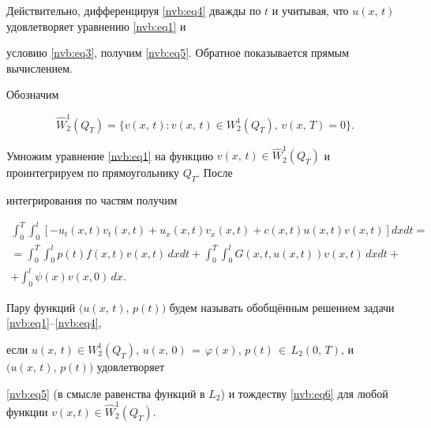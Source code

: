 Действительно, дифференцируя \eqref{nvb:eq4} дважды по $t$ и учитывая, что $u(x,\,t)$ удовлетворяет уравнению \eqref{nvb:eq1} и

условию \eqref{nvb:eq3}, получим \eqref{nvb:eq5}. Обратное показывается прямым вычислением.



Обозначим

      \begin{equation*}

      \hat{W}_2^1(Q_T)=\{ v(x,\,t): v(x,\,t)\in W_2^1(Q_T),\, v(x,\,T)=0\}.

      \end{equation*}

Умножим уравнение \eqref{nvb:eq1} на функцию $v(x,\,t) \in \hat{W}_2^1(Q_T)$ и проинтегрируем по прямоугольнику $Q_T$. После

интегрирования по частям получим

    \begin{multline}

    \label{nvb:eq6}

    \int _0^T\int _0^l \left[ - u_{t}(x,t)v_t(x,t)+u_x(x,t)v_x(x,t) +c(x,t)u(x,t)v(x,t)\right]dxdt=\\

    =\int _0^T\int _0^l p(t)f(x,t)v(x,t)\,dxdt+\int _0^T\int _0^l G(x,t,u(x,t)) v(x,t)\,dxdt +\\

    +\int _0^l \psi(x)v(x,0)\,dx.

    \end{multline}



\begin{definition}

  Пару функций $(u(x,\,t)$, $p(t))$ будем называть обобщённым решением задачи \eqref{nvb:eq1}--\eqref{nvb:eq4},

  если $u(x,\,t) \in W_2^1(Q_T)$, $u(x,\,0)\,{=}\,\varphi(x)$,  \mbox{$ p(t)\,{\in}\, L_2 (0,\, T)$,} и $(u(x,\,t)$, $p(t))$ удовлетворяет

   \eqref{nvb:eq5} (в смысле равенства функций в $L_2$) и тождеству \eqref{nvb:eq6} для любой функции $v(x,t) \in\hat{W}_2^1(Q_T)$.

\end{definition}



\smallskip






